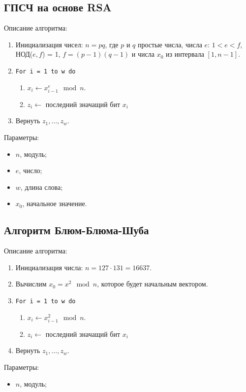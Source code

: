 \documentclass[bachelor, och, pract_otchet]{SCWorks}
\begin{document}
\subsection{ГПСЧ на основе RSA}
Описание алгоритма:
\begin{enumerate}
  \item Инициализация чисел: $n = pq$, где $p$ и $q$ простые числа, числа $e$: $1 < e < f$, НОД($e, f$) = 1, $f = (p - 1)(q - 1)$ и числа $x_0$ из интервала $[1, n - 1]$.
  \item \texttt{For i = 1 to w do}
        \begin{enumerate}
          \item $x_i \leftarrow x_{i-1}^e \mod n$.
          \item $z_i \leftarrow $ последний значащий бит $x_i$
        \end{enumerate}
  \item Вернуть $z_1, \dots, z_w$.
\end{enumerate}

Параметры:
\begin{itemize}
  \item $n$, модуль;
  \item $e$, число;
  \item $w$, длина слова;
  \item $x_0$, начальное значение.
\end{itemize}

\subsection{Алгоритм Блюм-Блюма-Шуба}
Описание алгоритма:
\begin{enumerate}
  \item Инициализация числа: $n = 127 \cdot 131 = 16637$.
  \item Вычислим $x_0 = x^2 \mod n$, которое будет начальным вектором.
  \item \texttt{For i = 1 to w do}
        \begin{enumerate}
          \item $x_i \leftarrow x_{i-1}^2 \mod n$.
          \item $z_i \leftarrow $ последний значащий бит $x_i$
        \end{enumerate}
  \item Вернуть $z_1, \dots, z_w$.
\end{enumerate}

Параметры:
\begin{itemize}
  \item $n$, модуль;
\end{itemize}
\end{document}
